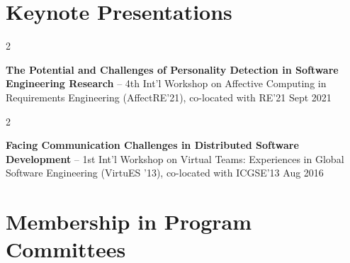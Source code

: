 \documentclass[10pt, a4paper]{article}
\newenvironment{twocolentry}[2][]{
    \onecolentry
    \def\secondColumn{#2}
    \setcolumnwidth{\fill, 4.5 cm}
    \begin{paracol}{2}
}{
    \switchcolumn \raggedleft \secondColumn
    \end{paracol}
    \endonecolentry
} %
\begin{document}
    
    \section{Keynote Presentations}



        
        \begin{twocolentry}{
            Sept 2021
        }
            \textbf{The Potential and Challenges of Personality Detection in Software Engineering Research} -- 4th Int'l Workshop on Affective Computing in Requirements Engineering (AffectRE’21), co-located with RE’21\end{twocolentry}



        \vspace{0.2 cm}

        \begin{twocolentry}{
            Aug 2016
        }
            \textbf{Facing Communication Challenges in Distributed Software Development} -- 1st Int’l Workshop on Virtual Teams: Experiences in Global Software Engineering (VirtuES ’13), co-located with ICGSE’13\end{twocolentry}




    
    \section{Membership in Program Committees}
\end{document}
